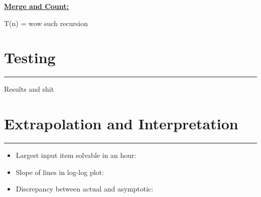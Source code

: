 \documentclass[letterpaper,10pt,titlepage,fleqn]{article}
\begin{document}
\begin{centering}
\underline{\large{\textbf{Merge and Count:}}}\\
\end{centering}
T(n) = wow such recursion


\section*{Testing}
\hrule
Results and shit

\section*{Extrapolation and Interpretation}
\hrule
\begin{itemize}
\item Largest input item solvable in an hour:
\item Slope of lines in log-log plot:
\item Discrepancy between actual and asymptotic:
\end{itemize}
\end{document}
